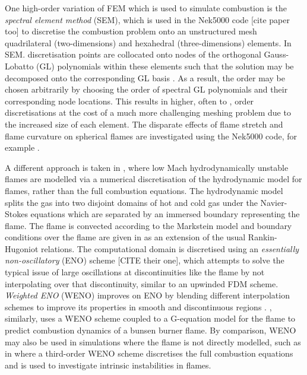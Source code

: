 One high-order variation of FEM which is used to simulate combustion is the \emph{spectral element method} (SEM), which is used in the Nek5000 code \cite{nek1996NEK5000} [cite paper too] to discretise the combustion problem onto an unstructured mesh quadrilateral (two-dimensions) and hexahedral (three-dimensions) elements. In SEM. discretisation points are collocated onto nodes of the orthogonal Gauss-Lobatto (GL) polynomials within these elements such that the solution may be decomposed onto the corresponding GL basis \cite{patera1984SpectralElementMethod}. As a result, the order may be chosen arbitrarily by choosing the order of spectral GL polynomials and their corresponding node locations. This results in higher, often  to , order discretisations at the cost of a much more challenging meshing problem due to the increased size of each element. The disparate effects of flame stretch and flame curvature on spherical flames are investigated using the Nek5000 code, for example \cite{giannakopoulos2015CurvatureMarksteinLength}.

A different approach is taken in \cite{krishnan2025NumericalMethodMultidimensional, patyal2018NonlinearDevelopmentHydrodynamicallyUnstable, creta2011StrainRateEffects}, where low Mach hydrodynamically unstable flames are modelled via a numerical discretisation of the hydrodynamic model for flames, rather than the full combustion equations. The hydrodynamic model \cite{matalon1982FlamesGasdynamicDiscontinuities,clavin1982EffectsMolecularDiffusion} splits the gas into two disjoint domains of hot and cold gas under the Navier-Stokes equations which are separated by an immersed boundary representing the flame. The flame is convected according to the Markstein model and boundary conditions over the flame are given in \cite{matalon1982FlamesGasdynamicDiscontinuities,clavin1982EffectsMolecularDiffusion} as an extension of the usual Rankin-Hugoniot relations. The computational domain is discretised using an \emph{essentially non-oscillatory} (ENO) scheme [CITE their one], which attempts to solve the typical issue of large oscillations at discontinuities like the flame by not interpolating over that discontinuity, similar to an upwinded FDM scheme. \emph{Weighted ENO} (WENO) improves on ENO by blending different interpolation schemes to improve its properties in smooth and discontinuous regions \cite{bozorgpour2025RecentAdvancementsFluid}. \cite{schuller2002ModelingToolsPrediction}, similarly, uses a WENO scheme coupled to a G-equation model for the flame to predict combustion dynamics of a bunsen burner flame. By comparison, WENO may also be used in simulations where the flame is not directly modelled, such as in \cite{berger2022IntrinsicInstabilitiesPremixed} where a third-order WENO scheme discretises the full combustion equations and is used to investigate intrinsic instabilities in flames.

